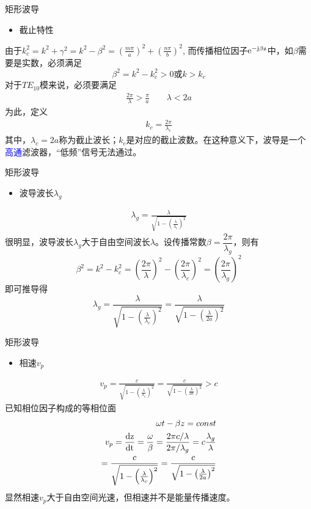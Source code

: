 \begin{frame}{矩形波导}
    \begin{itemize}
        \item 截止特性
    \end{itemize}
    由于$k_c^2=k^2+\gamma^2=k^2-\beta^2=\left(\frac{m\pi}{a}\right)^2+\left(\frac{n\pi}{b}\right)^2$,
    而传播相位因子$\rm{e}^{-\rm{j}\beta z}$中，如$\beta$需要是实数，必须满足
    $$\beta^2=k^2-k_c^2>0或k>k_c$$
    对于$TE_{10}$模来说，必须要满足
    \begin{align}
        \frac{2\pi}{\lambda}>\frac{\pi}{a}\qquad \lambda<2a
    \end{align}
    为此，定义
    \begin{align}
        k_c=\frac{2\pi}{\lambda_c}
    \end{align}
    其中，$\lambda_c=2a$称为截止波长；$k_c$是对应的截止波数。在这种意义下，波导是一个\textcolor{blue}{高通}滤波器，“低频”信号无法通过。
    
\end{frame}

\begin{frame}{矩形波导}
    \begin{itemize}
        \item 波导波长$\lambda_g$
    \end{itemize}
    \begin{align}
        \lambda_g=\frac{\lambda}{\sqrt{1-\left(\frac{\lambda}{\lambda_c}\right)^2}}
    \end{align}
    很明显，波导波长$\lambda_g$大于自由空间波长$\lambda$。设传播常数$\beta=\dfrac{2\pi}{\lambda_g}$，则有
    $$\beta^2=k^2-k_c^2=\left(\frac{2\pi}{\lambda}\right)^2-\left(\frac{2\pi}{\lambda_c}\right)^2=\left(\frac{2\pi}{\lambda_g}\right)^2$$
    即可推导得
    $$\lambda_g=\frac{\lambda}{\sqrt{1-\left(\frac{\lambda}{\lambda_c}\right)^2}}=\frac{\lambda}{\sqrt{1-\left(\frac{\lambda}{2a}\right)^2}}$$
\end{frame}

\begin{frame}{矩形波导}
    \begin{itemize}
        \item 相速$v_p$
    \end{itemize}
    \begin{align}
        v_p=\frac{c}{\sqrt{1-\left(\frac{\lambda}{\lambda_c}\right)^2}}=\frac{c}{\sqrt{1-\left(\frac{\lambda}{2a}\right)^2}}>c
    \end{align}
    已知相位因子构成的等相位面
    \begin{align*}
        \omega t-\beta z=const \\
        v_p=\frac{\rm{d}z}{\rm{d}t}=\frac{\omega}{\beta}=\frac{2\pi c/\lambda}{2\pi/\lambda_g}=c\frac{\lambda_g}{\lambda} \\
           =\frac{c}{\sqrt{1-\left(\frac{\lambda}{\lambda_c}\right)^2}}=\frac{c}{\sqrt{1-\left(\frac{\lambda}{2a}\right)^2}} 
    \end{align*}
    显然相速$v_p$大于自由空间光速，但相速并不是能量传播速度。
\end{frame}

